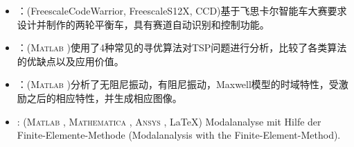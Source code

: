 \documentclass[zh]{resume}
\newcommand{\Matlab}{\textsc{Matlab}\textsuperscript{\textregistered} }
\newcommand{\Ansys}{\textsc{Ansys}\textsuperscript{\textregistered} }
\newcommand{\Mathematica}{\textsc{Mathematica}\textsuperscript{\textregistered} }
\newcommand{\Microsoft}{\textsc{Microsoft}\textsuperscript{\textregistered} }
\begin{document}
% 
%  
%  
%  

\begin{itemize}
	\item {}：(Freescale\textregistered CodeWarrior, Freescale\textregistered S12X, CCD)基于飞思卡尔智能车大赛要求设计并制作的两轮平衡车，具有赛道自动识别和控制功能。
	
	\item {}：(\Matlab)使用了4种常见的寻优算法对TSP问题进行分析，比较了各类算法的优缺点以及应用价值。
	
	\item {}：(\Matlab)分析了无阻尼振动，有阻尼振动，Maxwell模型的时域特性，受激励之后的相应特性，并生成相应图像。
	
	\item {}: (\Matlab, \Mathematica, \Ansys, \LaTeX)
	      Modalanalyse mit Hilfe der Finite-Elemente-Methode (Modalanalysis with the Finite-Element-Method). \\
  		
\end{itemize}
\end{document}

